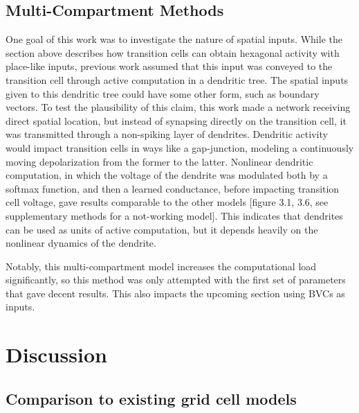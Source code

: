 \documentclass{article}
\begin{document}
    \subsection{Multi-Compartment Methods}
    One goal of this work was to investigate the nature of spatial inputs. While the section above describes how transition cells can obtain hexagonal activity with place-like inputs, previous work assumed that this input was conveyed to the transition cell through active computation in a dendritic tree. The spatial inputs given to this dendritic tree could have some other form, such as boundary vectors. To test the plausibility of this claim, this work made a network receiving direct spatial location, but instead of synapsing directly on the transition cell, it was transmitted through a non-spiking layer of dendrites. Dendritic activity would impact transition cells in ways like a gap-junction, modeling a continuously moving depolarization from the former to the latter. Nonlinear dendritic computation, in which the voltage of the dendrite was modulated both by a softmax function, and then a learned conductance, before impacting transition cell voltage, gave results comparable to the other models [figure 3.1, 3.6, see supplementary methods for a not-working model]. This indicates that dendrites can be used as units of active computation, but it depends heavily on the nonlinear dynamics of the dendrite.

    Notably, this multi-compartment model increases the computational load significantly, so this method was only attempted with the first set of parameters that gave decent results. This also impacts the upcoming section using BVCs as inputs.


    \section{Discussion}

    \subsection{Comparison to existing grid cell models}
\end{document}
